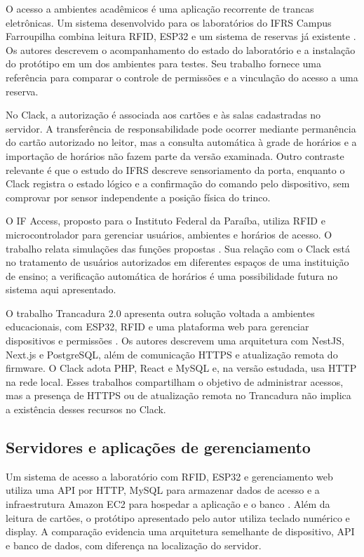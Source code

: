 \documentclass[12pt]{article}
\begin{document}
O acesso a ambientes acadêmicos é uma aplicação recorrente de trancas eletrônicas. Um sistema desenvolvido para os laboratórios do IFRS Campus Farroupilha combina leitura RFID, ESP32 e um sistema de reservas já existente \cite{alves2022reservas}. Os autores descrevem o acompanhamento do estado do laboratório e a instalação do protótipo em um dos ambientes para testes. Seu trabalho fornece uma referência para comparar o controle de permissões e a vinculação do acesso a uma reserva.

No Clack, a autorização é associada aos cartões e às salas cadastradas no servidor. A transferência de responsabilidade pode ocorrer mediante permanência do cartão autorizado no leitor, mas a consulta automática à grade de horários e a importação de horários não fazem parte da versão examinada. Outro contraste relevante é que o estudo do IFRS descreve sensoriamento da porta, enquanto o Clack registra o estado lógico e a confirmação do comando pelo dispositivo, sem comprovar por sensor independente a posição física do trinco.

O IF Access, proposto para o Instituto Federal da Paraíba, utiliza RFID e microcontrolador para gerenciar usuários, ambientes e horários de acesso. O trabalho relata simulações das funções propostas \cite{silva2022ifaccess}. Sua relação com o Clack está no tratamento de usuários autorizados em diferentes espaços de uma instituição de ensino; a verificação automática de horários é uma possibilidade futura no sistema aqui apresentado.

O trabalho Trancadura 2.0 apresenta outra solução voltada a ambientes educacionais, com ESP32, RFID e uma plataforma web para gerenciar dispositivos e permissões \cite{lima2025trancadura}. Os autores descrevem uma arquitetura com NestJS, Next.js e PostgreSQL, além de comunicação HTTPS e atualização remota do firmware. O Clack adota PHP, React e MySQL e, na versão estudada, usa HTTP na rede local. Esses trabalhos compartilham o objetivo de administrar acessos, mas a presença de HTTPS ou de atualização remota no Trancadura não implica a existência desses recursos no Clack.

\subsection{Servidores e aplicações de gerenciamento}

Um sistema de acesso a laboratório com RFID, ESP32 e gerenciamento web utiliza uma API por HTTP, MySQL para armazenar dados de acesso e a infraestrutura Amazon EC2 para hospedar a aplicação e o banco \cite{goncalves2019rfidweb}. Além da leitura de cartões, o protótipo apresentado pelo autor utiliza teclado numérico e display. A comparação evidencia uma arquitetura semelhante de dispositivo, API e banco de dados, com diferença na localização do servidor.
\end{document}
